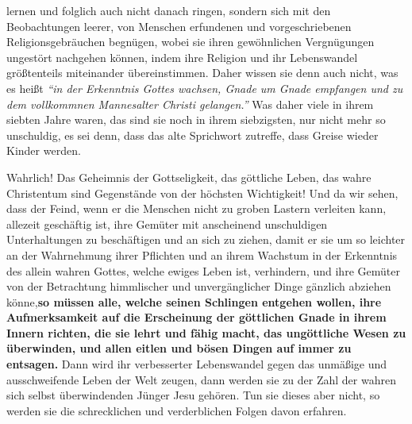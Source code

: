 lernen und folglich auch nicht danach ringen, sondern sich mit den
Beobachtungen leerer, von Menschen erfundenen und vorgeschriebenen
Religionsgebräuchen begnügen, wobei sie ihren gewöhnlichen Vergnügungen
ungestört nachgehen können, indem ihre Religion und ihr Lebenswandel
größtenteils miteinander übereinstimmen. Daher wissen sie denn auch nicht, was
es heißt
\textit{"`in der Erkenntnis Gottes wachsen, Gnade um Gnade empfangen und zu
dem vollkommnen Mannesalter Christi gelangen."'}
Was daher viele in ihrem siebten Jahre waren, das sind sie noch in
ihrem siebzigsten, nur nicht mehr so unschuldig, es sei denn, dass das alte
Sprichwort zutreffe, dass Greise wieder Kinder werden.

\medskip

Wahrlich! Das Geheimnis der Gottseligkeit, das göttliche
Leben, das wahre
Christentum sind Gegenstände von der höchsten Wichtigkeit! Und da wir sehen,
dass der Feind, wenn er die Menschen nicht zu groben Lastern verleiten kann,
allezeit geschäftig ist, ihre Gemüter mit anscheinend unschuldigen
Unterhaltungen zu beschäftigen und an sich zu ziehen, damit er sie um so
leichter an der Wahrnehmung ihrer Pflichten und an ihrem Wachstum in der
Erkenntnis des allein wahren Gottes, welche ewiges Leben ist,
verhindern, und ihre Gemüter von der Betrachtung himmlischer und
unvergänglicher Dinge gänzlich abziehen könne,\textbf{so müssen alle, welche
seinen
Schlingen entgehen wollen, ihre Aufmerksamkeit auf die Erscheinung der
göttlichen Gnade in ihrem Innern richten, die sie lehrt und fähig
macht, das
ungöttliche Wesen zu überwinden, und allen eitlen
und bösen Dingen auf immer zu
entsagen.}
Dann wird ihr verbesserter Lebenswandel gegen
das unmäßige und ausschweifende Leben der Welt zeugen, dann werden sie zu der
Zahl der wahren sich selbst überwindenden Jünger Jesu
gehören. Tun sie dieses
aber nicht, so werden sie die schrecklichen und verderblichen Folgen davon
erfahren.

\medskip

